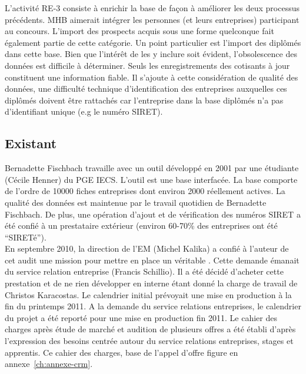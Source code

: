 \documentclass{book}
\begin{document}
L'activité  RE-3 consiste  à enrichir  la  base de  façon à  améliorer les  deux
processus précédents. MHB aimerait intégrer les personnes (et leurs entreprises)
participant au concours. L'import des prospects acquis sous une forme quelconque
fait également partie de cette catégorie.  Un point particulier est l'import des
diplômés dans  cette base.  Bien que  l'intérêt de les  y inclure  soit évident,
l'obsolescence   des   données   est   difficile  à   déterminer.    Seuls   les
enregistrements des  cotisants à  jour constituent  une information  fiable.  Il
s'ajoute à cette considération de  qualité des données, une difficulté technique
d'identification des entreprises auxquelles  ces diplômés doivent être rattachés
car l'entreprise  dans la  base diplômés  n'a pas  d'identifiant unique  (e.g le
numéro SIRET).



\subsection{Existant}

Bernadette Fischbach travaille avec un outil développé en 2001 par une étudiante
(Cécile Henner) du PGE IECS. L'outil est une base  interfacée. La
base  comporte  de  l'ordre  de  10000  fiches  entreprises  dont  environ  2000
réellement  actives.  La  qualité  des  données est  maintenue  par  le  travail
quotidien  de  Bernadette  Fischbach.  De  plus, une  opération  d'ajout  et  de
vérification des numéros SIRET a été  confié à un prestataire extérieur (environ
60-70\% des entreprises ont été ``SIRETé'').\\

En septembre 2010, la  direction de l'EM (Michel Kalika) a  confié à l'auteur de
cet audit  une mission  pour mettre  en place  un véritable  . Cette
demande  émanait du  service relation  entreprise (Francis  Schillio). Il  a été
décidé d'acheter  cette prestation  et de  ne rien  développer en  interne étant
donné  la  charge de  travail  de  Christos  Karacostas. Le  calendrier  initial
prévoyait une  mise en production à  la fin du  printemps 2011. A la  demande du
service relations  entreprises, le calendrier du  projet a été reporté  pour une
mise en  production fin 2011.   Le cahier des charges  après étude de  marché et
audition  de plusieurs  offres a  été  établi d'après  l'expression des  besoins
centrée autour du service relations entreprises, stages et apprentis.  Ce cahier
des charges, base de l'appel d'offre figure en annexe~\ref{ch:annexe-crm}.\\
\end{document}
